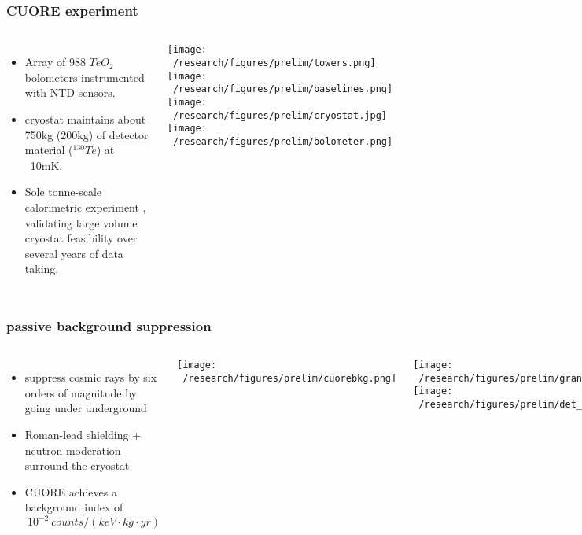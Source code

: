 \documentclass{beamer}
\begin{document}
	\begin{frame}
		\frametitle{CUORE experiment}
		\begin{columns}[c] %
			
			\begin{itemize}
			\item Array of 988 $TeO_2$ bolometers instrumented with NTD sensors.
			\item cryostat maintains about 750kg (200kg) of detector material ($^{130}Te$) at  ~10mK.
			\item Sole tonne-scale calorimetric experiment , validating large volume cryostat feasibility over several years of data taking.		
			\end{itemize}			 
			\texttt{[image: ~/research/figures/prelim/towers.png]}
			\texttt{[image: ~/research/figures/prelim/baselines.png]}
			\texttt{[image: ~/research/figures/prelim/cryostat.jpg]}
			\vspace{-10pt}
			\texttt{[image: ~/research/figures/prelim/bolometer.png]}
			
		\end{columns}
	\end{frame}
	
	\begin{frame}
		\frametitle{passive background suppression}
		\begin{columns}[c] %
			
			\begin{itemize}
			\item suppress cosmic rays by six orders of magnitude by going under underground
			\item Roman-lead shielding + neutron moderation surround the cryostat
			\item CUORE achieves a background index of $~ 10^{-2} \  counts/(keV\cdot kg \cdot yr)$ 
			\end{itemize}			 
			\texttt{[image: ~/research/figures/prelim/cuorebkg.png]}
		
			\texttt{[image: ~/research/figures/prelim/gransasso.jpg]}
			\vspace{-10pt}
			\texttt{[image: ~/research/figures/prelim/det\_shielding.png]}
			
		\end{columns}
	\end{frame}
	
\end{document}
